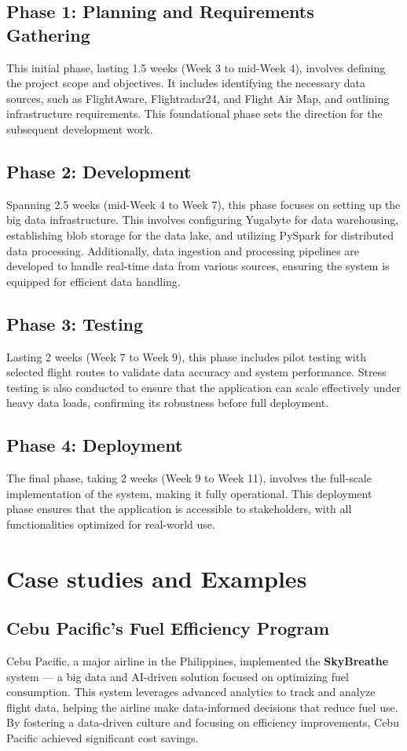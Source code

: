 \documentclass[12pt, a4paper]{article}
\begin{document}
\subsection*{Phase 1: Planning and Requirements Gathering}
This initial phase, lasting 1.5 weeks (Week 3 to mid-Week 4), involves defining
the project scope and objectives. It includes identifying the necessary data
sources, such as FlightAware, Flightradar24, and Flight Air Map, and outlining
infrastructure requirements. This foundational phase sets the direction for the
subsequent development work.

\subsection*{Phase 2: Development}
Spanning 2.5 weeks (mid-Week 4 to Week 7), this phase focuses on setting up the
big data infrastructure. This involves configuring Yugabyte for data
warehousing, establishing blob storage for the data lake, and utilizing PySpark
for distributed data processing. Additionally, data ingestion and processing
pipelines are developed to handle real-time data from various sources, ensuring
the system is equipped for efficient data handling.
\subsection*{Phase 3: Testing}
Lasting 2 weeks (Week 7 to Week 9), this phase includes pilot testing with
selected flight routes to validate data accuracy and system performance. Stress
testing is also conducted to ensure that the application can scale effectively
under heavy data loads, confirming its robustness before full deployment.
\subsection*{Phase 4: Deployment}
The final phase, taking 2 weeks (Week 9 to Week 11), involves the full-scale
implementation of the system, making it fully operational. This deployment phase
ensures that the application is accessible to stakeholders, with all
functionalities optimized for real-world use.

\section{Case studies and Examples}
    \subsection{Cebu Pacific’s Fuel Efficiency Program}
    Cebu Pacific, a major airline in the Philippines, implemented the
    \textbf{SkyBreathe} system — a big data and AI-driven solution focused on
    optimizing fuel consumption. This system leverages advanced analytics to
    track and analyze flight data, helping the airline make data-informed
    decisions that reduce fuel use. By fostering a data-driven culture and
    focusing on efficiency improvements, Cebu Pacific achieved significant cost
    savings.
\end{document}
